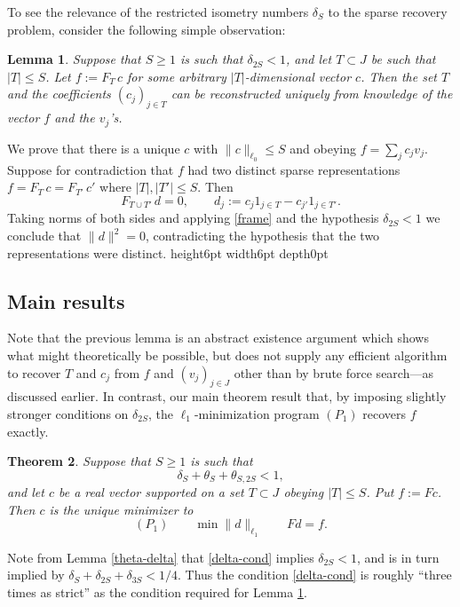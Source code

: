 \documentclass[11pt]{article}
\newenvironment{proof}{\noindent {\bf Proof} }{\endprf\par}
\def \endprf{\hfill {\vrule height6pt width6pt depth0pt}\medskip}
\newcommand{\<}{\langle}
\renewcommand{\>}{\rangle}
\newtheorem{theorem}{Theorem}[section]
\newtheorem{lemma}[theorem]{Lemma}
\numberwithin{equation}{section}
\begin{document}
To see the relevance of the restricted isometry numbers $\delta_S$ to
the sparse recovery problem, consider the following simple
observation:
\begin{lemma}\label{recover}  
  Suppose that $S \geq 1$ is such that $\delta_{2S} < 1$, and let $T
  \subset J$ be such that $|T| \leq S$.  Let $f := F_T \, c$ for some
  arbitrary $|T|$-dimensional vector $c$.  Then the set $T$ and the
  coefficients $(c_j)_{j \in T}$ can be reconstructed uniquely from
  knowledge of the vector $f$ and the $v_j$'s.
\end{lemma}
\begin{proof}  
  We prove that there is a unique $c$ with $\|c\|_{\ell_0} \le S$ and
  obeying $f = \sum_j c_j v_j$.  Suppose for contradiction that $f$
  had two distinct sparse representations $f = F_T \, c = F_{T'} \,
  c'$ where $|T|, |T'| \leq S$. Then
$$
F_{T \cup T'}\, d = 0, \qquad d_j := c_j 1_{j \in T} - c_{j'} 1_{j \in T'}.
$$
Taking norms of both sides and applying \eqref{frame} and the
hypothesis $\delta_{2S} < 1$ we conclude that $\|d\|^2 = 0$,
contradicting the hypothesis that the two representations were
distinct.
\end{proof}

\subsection{Main results}

Note that the previous lemma is an abstract existence argument which
shows what might theoretically be possible, but does not supply any
efficient algorithm to recover $T$ and $c_j$ from $f$ and $(v_j)_{j
  \in J}$ other than by brute force search---as discussed earlier.  In
contrast, our main theorem result that, by imposing slightly stronger
conditions on $\delta_{2S}$, the $\ell_1$-minimization program $(P_1)$
recovers $f$ exactly.
\begin{theorem}\label{recover-better} 
Suppose that $S \geq 1$ is such that 
\begin{equation}\label{delta-cond}
\delta_S + \theta_S + \theta_{S,2S} < 1,
\end{equation} 
and let $c$ be a real vector supported on a set $T \subset J$ obeying
$|T| \leq S$.  Put $f := F c$.  Then $c$ is the unique minimizer to
\[
(P_1) \quad \quad \min \|d\|_{\ell_1} \qquad F d = f. 
\]
\end{theorem}
Note from Lemma \ref{theta-delta} that \eqref{delta-cond} implies
$\delta_{2S} < 1$, and is in turn implied by $\delta_S +
\delta_{2S}+\delta_{3S} < 1/4$.  Thus the condition \eqref{delta-cond}
is roughly ``three times as strict'' as the condition required for
Lemma \ref{recover}.
\end{document}
